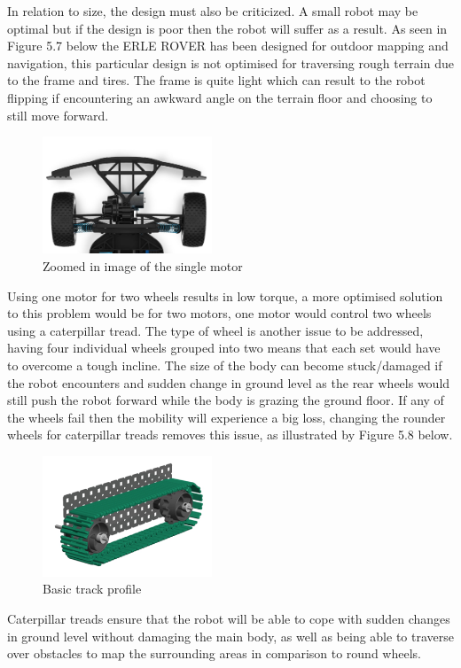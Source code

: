 \documentclass[12pt]{report}
\begin{document}
\vspace{1em}
In relation to size, the design must also be criticized. A small robot may be optimal but if the design is poor then the robot will suffer as a result. As seen in Figure 5.7 below the ERLE ROVER has been designed for outdoor mapping and navigation, this particular design is not optimised for traversing rough terrain due to the frame and tires. The frame is quite light which can result to the robot flipping if encountering an awkward angle on the terrain floor and choosing to still move forward.\par
\begin{figure}[H]
        \centering
        \includegraphics[width=0.45\textwidth]{Fig15.png}
        \caption{Zoomed in image of the single motor}
        \label{fig:15}
\end{figure}
\vspace{1em}
Using one motor for two wheels results in low torque, a more optimised solution to this problem would be for two motors, one motor would control two wheels using a caterpillar tread. The type of wheel is another issue to be addressed, having four individual wheels grouped into two means that each set would have to overcome a tough incline. The size of the body can become stuck/damaged if the robot encounters and sudden change in ground level as the rear wheels would still push the robot forward while the body is grazing the ground floor. If any of the wheels fail then the mobility will experience a big loss, changing the rounder wheels for caterpillar treads removes this issue, as illustrated by Figure 5.8 below.\par
\begin{figure}[H]
        \centering
        \includegraphics[width=0.45\textwidth]{Fig16.png}
        \caption{Basic track profile}
        \label{fig:16}
\end{figure}
\vspace{1em}
Caterpillar treads ensure that the robot will be able to cope with sudden changes in ground level without damaging the main body, as well as being able to traverse over obstacles to map the surrounding areas in comparison to round wheels.\par
\end{document}
